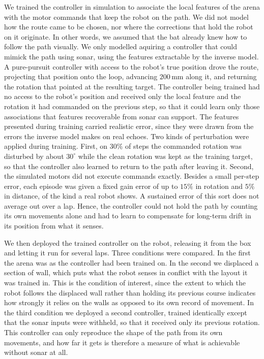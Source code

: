 \documentclass[11pt]{article}
\begin{document}
We trained the controller in simulation to associate the local features of the arena with the motor commands that keep the robot on the path. We did not model how the route came to be chosen, nor where the corrections that hold the robot on it originate. In other words, we assumed that the bat already knew how to follow the path visually. We only modelled aquiring a controller that could mimick the path using sonar, using the features extractable by the inverse model. A pure-pursuit controller with access to the robot's true position drove the route, projecting that position onto the loop, advancing $200$\,mm along it, and returning the rotation that pointed at the resulting target. The controller being trained had no access to the robot's position and received only the local feature and the rotation it had commanded on the previous step, so that it could learn only those associations that features recoverable from sonar can support. The features presented during training carried realistic error, since they were drawn from the errors the inverse model makes on real echoes. Two kinds of perturbation were applied during training. First, on $30\%$ of steps the commanded rotation was disturbed by about $30^{\circ}$ while the clean rotation was kept as the training target, so that the controller also learned to return to the path after leaving it. Second, the simulated motors did not execute commands exactly. Besides a small per-step error, each episode was given a fixed gain error of up to $15\%$ in rotation and $5\%$ in distance, of the kind a real robot shows. A sustained error of this sort does not average out over a lap. Hence, the controller could not hold the path by counting its own movements alone and had to learn to compensate for long-term drift in its position from what it senses.


We then deployed the trained controller on the robot, releasing it from the box and letting it run for several laps. Three conditions were compared. In the first the arena was as the controller had been trained on. In the second we displaced a section of wall, which puts what the robot senses in conflict with the layout it was trained in. This is the condition of interest, since the extent to which the robot follows the displaced wall rather than holding its previous course indicates how strongly it relies on the walls as opposed to its own record of movement. In the third condition we deployed a second controller, trained identically except that the sonar inputs were withheld, so that it received only its previous rotation. This controller can only reproduce the shape of the path from its own movements, and how far it gets is therefore a measure of what is achievable without sonar at all.
\end{document}
